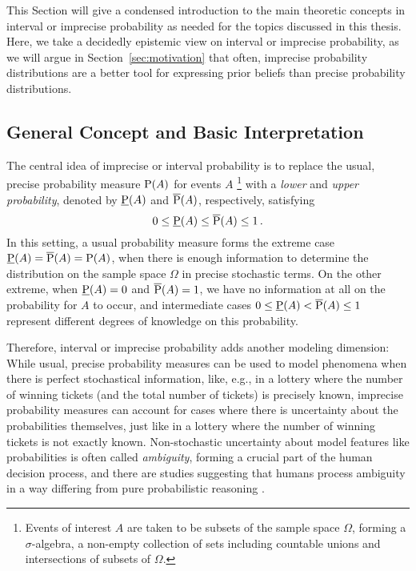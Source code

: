 This Section will give a condensed introduction to the main theoretic concepts
in interval or imprecise probability as needed for the topics discussed in this thesis.
Here, we take a decidedly epistemic view on interval or imprecise probability,
as we will argue in Section~\ref{sec:motivation} that often,
imprecise probability distributions are a better tool for expressing prior beliefs
than precise probability distributions.



\subsection{General Concept and Basic Interpretation}
\label{sec:ip-general}

The central idea of imprecise or interval probability \parencite{1991:walley, 2001:weichselberger, 2011:IESS-ip} is
to replace the usual, precise probability measure $\operatorname{P}(A)$ for events $A$%
\footnote{Events of interest $A$ are taken to be subsets of the sample space $\Omega$,
forming a $\sigma$-algebra, a non-empty collection of sets including countable unions and intersections of subsets of $\Omega$.}
with a \emph{lower} and \emph{upper probability}, denoted by $\underline{\operatorname{P}}(A)$ and $\overline{\operatorname{P}}(A)$, respectively,
satisfying
\begin{equation}
\label{eq:0ip1}
0 \le \underline{\operatorname{P}}(A) \le \overline{\operatorname{P}}(A) \le 1\,.
\end{equation}
In this setting, a usual probability measure forms the extreme case $\underline{\operatorname{P}}(A) = \overline{\operatorname{P}}(A) = \operatorname{P}(A)$,
when there is enough information to determine the distribution on the sample space $\Omega$
in precise stochastic terms.
On the other extreme, when $\underline{\operatorname{P}}(A) = 0$ and $\overline{\operatorname{P}}(A) = 1$,
we have no information at all on the probability for $A$ to occur,
and intermediate cases $0 \le \underline{\operatorname{P}}(A) < \overline{\operatorname{P}}(A) \le 1$ represent
different degrees of knowledge on this probability.

Therefore, interval or imprecise probability adds another modeling dimension:
While usual, precise probability measures can be used to model phenomena when there is perfect stochastical information,
like, e.g., in a lottery where the number of winning tickets (and the total number of tickets) is precisely known,
imprecise probability measures can account for cases where there is uncertainty about the probabilities themselves,
just like in a lottery where the number of winning tickets is not exactly known.
Non-stochastic uncertainty about model features like probabilities is often called \emph{ambiguity},
forming a crucial part of the human decision process,
and there are studies suggesting that humans process ambiguity in a way
differing from pure probabilistic reasoning \parencite{2005:hsu-bhatt}.

